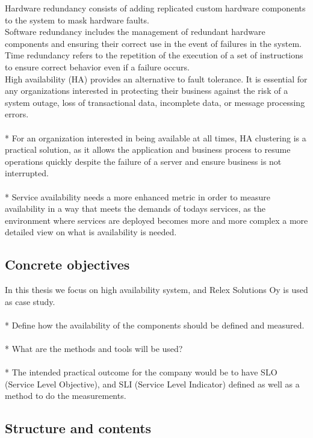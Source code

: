 \documentclass[english]{tktltiki2}
\theoremstyle{definition}
\theoremstyle{remark}
\begin{document}
Hardware redundancy consists of adding replicated custom hardware components to the system to mask hardware faults.\\
Software redundancy includes the management of redundant hardware components and ensuring their correct use in the event of failures in the system.\\ 
Time redundancy refers to the repetition of the execution of a set of instructions to ensure correct behavior even if a failure occurs.\\
High availability (HA) \cite{doi:10.1177/109434200101500209} provides an alternative to fault tolerance. It  is essential for any organizations interested in protecting their business against the risk of a system outage, loss of transactional data, incomplete data, or message processing errors.\\ \\*
For an organization interested in being available at all times, HA clustering is a practical solution, as it allows the application and business process to resume operations quickly despite the failure of a server and ensure business is not interrupted.\\  \\*
Service availability needs a more enhanced metric in order to measure availability in a way that meets the demands of todays services, as the environment where services are deployed becomes more and more complex \cite{article} a more detailed view on what is availability is needed.

\subsection{Concrete objectives}

In this thesis we focus on  high availability system, and Relex Solutions Oy is used as case study.\\
\\*
Define how the availability of the components should be defined and measured.\\
\\*
What are the methods and tools will be used?\\
\\* 
The intended practical outcome for the company would be to have SLO (Service Level Objective), and SLI (Service Level Indicator) defined as well as a method to do the measurements.




\subsection{Structure and contents}
\end{document}

